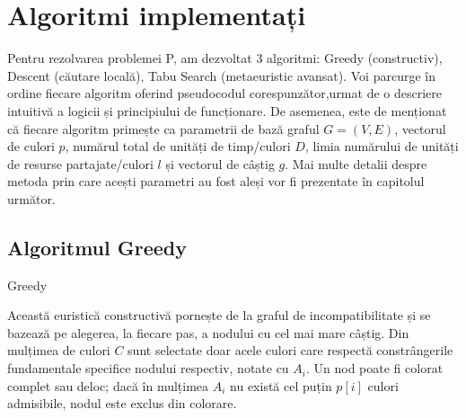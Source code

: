 \chapter{Algoritmi implementați}
Pentru rezolvarea problemei P, am dezvoltat 3 algoritmi: Greedy (constructiv), Descent (căutare locală), Tabu Search (metaeuristic avansat). Voi parcurge în ordine fiecare algoritm oferind pseudocodul corespunzător,urmat de o descriere intuitivă a logicii și principiului de funcționare. De asemenea, este de menționat că fiecare algoritm primește ca parametrii de bază graful $G=(V,E)$, vectorul de culori $p$, numărul total de unități de timp/culori $D$, limia numărului de unități de resurse partajate/culori $l$ și vectorul de câștig $g$. Mai multe detalii despre metoda prin care acești parametri au fost aleși vor fi prezentate în capitolul următor.


\section{Algoritmul Greedy}

\begin{algorithm}[H] 
\caption{Greedy}\label{alg:greedy_multicoloring} 
\begin{algorithmic}[1] 
\small
{}
    \EndIf{}     
    \Else{}         
    \EndIf{}
\EndWhile{}

\end{algorithmic} 
\end{algorithm}

Această euristică constructivă pornește de la graful de incompatibilitate și se bazează pe alegerea, la fiecare pas, a nodului cu cel mai mare câștig. Din mulțimea de culori $C$ sunt selectate doar acele culori care respectă constrângerile fundamentale specifice nodului respectiv, notate cu $A_i$. Un nod poate fi colorat complet sau deloc; dacă în mulțimea $A_i$ nu există cel puțin $p[i]$ culori admisibile, nodul este exclus din colorare.

